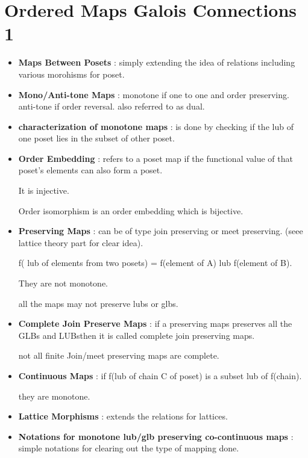 \chapter{Ordered Maps Galois Connections 1}

\begin{itemize}

	\item{\textbf{Maps Between Posets} : simply extending the idea of relations including various morohisms for poset.
	}

	\item{\textbf{Mono/Anti-tone Maps} : monotone if one to one and order preserving. anti-tone if order reversal. also referred to as dual.
	}

	\item{\textbf{characterization of monotone maps} : is done by checking if the lub of one poset lies in the subset of other poset. 
	}

	\item{\textbf{Order Embedding} : refers to a poset map if the functional value of that poset's elements can also form a poset.

	It is injective.

	Order isomorphism is an order embedding which is bijective.
	}

	\item{\textbf{Preserving Maps} : can be of type join preserving or meet preserving. (seee lattice theory part for clear idea). 

	f( lub of elements from two posets) = f(element of A) lub f(element of B).

	They are not monotone.

	all the maps may not preserve lubs or glbs.
	}

	\item{\textbf{Complete Join Preserve Maps} : if a preserving maps preserves all the GLBs and LUBsthen it is called complete join preserving maps.

	not all finite Join/meet preserving maps are complete.
	}

	\item{\textbf{Continuous Maps} : if f(lub of chain C of poset) is a subset lub of f(chain).

	they are monotone.
	}

	\item{\textbf{Lattice Morphisms} : extends the relations for lattices.
	}

	\item{\textbf{Notations for monotone lub/glb preserving co-continuous maps} : simple notations for clearing out the type of mapping done.
	}


\end{itemize}

